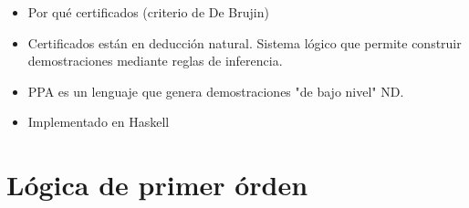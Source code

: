 \begin{itemize}
    \item Por qué certificados (criterio de De Brujin)
    \item Certificados están en deducción natural. Sistema lógico que permite
    construir demostraciones mediante reglas de inferencia.
    \item PPA es un lenguaje que genera demostraciones "de bajo nivel" ND.
    \item Implementado en Haskell
\end{itemize}

\section{Lógica de primer órden}

